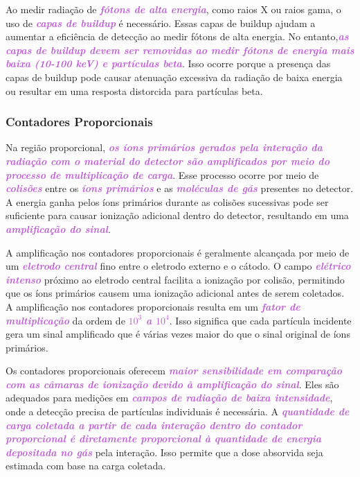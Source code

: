 \documentclass[11pt,a4paper]{article}
\begin{document}
	Ao medir radiação de \textcolor{MediumOrchid}{\textit{\textbf{fótons de alta energia}}}, como raios X ou raios gama, o uso de \textcolor{MediumOrchid}{\textit{\textbf{capas de buildup}}} é necessário. Essas capas de buildup ajudam a aumentar a eficiência de detecção ao medir fótons de alta energia. No entanto,\textcolor{MediumOrchid}{\textit{\textbf{as capas de buildup devem ser removidas ao medir fótons de energia mais baixa (10-100 keV) e partículas beta}}}. Isso ocorre porque a presença das capas de buildup pode causar atenuação excessiva da radiação de baixa energia ou resultar em uma resposta distorcida para partículas beta.

\subsubsection*{Contadores Proporcionais}

	Na região proporcional, \textcolor{MediumOrchid}{\textit{\textbf{os íons primários gerados pela interação da radiação com o material do detector são amplificados por meio do processo de multiplicação de carga}}}. Esse processo ocorre por meio de \textcolor{MediumOrchid}{\textit{\textbf{colisões}}} entre os \textcolor{MediumOrchid}{\textit{\textbf{íons primários}}} e as \textcolor{MediumOrchid}{\textit{\textbf{moléculas de gás}}} presentes no detector. A energia ganha pelos íons primários durante as colisões sucessivas pode ser suficiente para causar ionização adicional dentro do detector, resultando em uma \textcolor{MediumOrchid}{\textit{\textbf{amplificação do sinal}}}.

	A amplificação nos contadores proporcionais é geralmente alcançada por meio de um \textcolor{MediumOrchid}{\textit{\textbf{eletrodo central}}} fino entre o eletrodo externo e o cátodo. O campo \textcolor{MediumOrchid}{\textit{\textbf{elétrico intenso}}} próximo ao eletrodo central facilita a ionização por colisão, permitindo que os íons primários causem uma ionização adicional antes de serem coletados. A amplificação nos contadores proporcionais resulta em um \textcolor{MediumOrchid}{\textit{\textbf{fator de multiplicação}}} da ordem de \textcolor{MediumOrchid}{\textit{\textbf{$10^3$ a $10^4$}}}. Isso significa que cada partícula incidente gera um sinal amplificado que é várias vezes maior do que o sinal original de íons primários.

	Os contadores proporcionais oferecem \textcolor{MediumOrchid}{\textit{\textbf{maior sensibilidade em comparação com as câmaras de ionização devido à amplificação do sinal}}}. Eles são adequados para medições em \textcolor{MediumOrchid}{\textit{\textbf{campos de radiação de baixa intensidade}}}, onde a detecção precisa de partículas individuais é necessária. A \textcolor{MediumOrchid}{\textit{\textbf{quantidade de carga coletada a partir de cada interação dentro do contador proporcional é diretamente proporcional à quantidade de energia depositada no gás}}} pela interação. Isso permite que a dose absorvida seja estimada com base na carga coletada.
\end{document}
